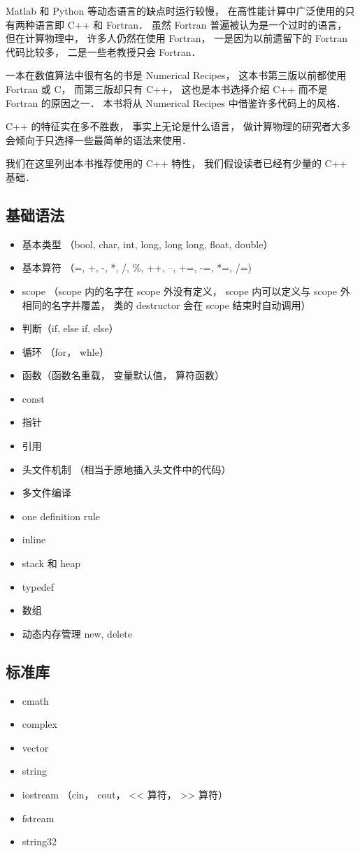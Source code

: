 
Matlab 和 Python 等动态语言的缺点时运行较慢， 在高性能计算中广泛使用的只有两种语言即 C++ 和 Fortran． 虽然 Fortran 普遍被认为是一个过时的语言， 但在计算物理中， 许多人仍然在使用 Fortran， 一是因为以前遗留下的 Fortran 代码比较多， 二是一些老教授只会 Fortran．

一本在数值算法中很有名的书是 Numerical Recipes， 这本书第三版以前都使用 Fortran 或 C， 而第三版却只有 C++， 这也是本书选择介绍 C++ 而不是 Fortran 的原因之一． 本书将从 Numerical Recipes 中借鉴许多代码上的风格．

C++ 的特征实在多不胜数， 事实上无论是什么语言， 做计算物理的研究者大多会倾向于只选择一些最简单的语法来使用．

我们在这里列出本书推荐使用的 C++ 特性， 我们假设读者已经有少量的 C++ 基础．

\subsection{基础语法}
\begin{itemize}
\item 基本类型 （bool, char, int, long, long long, float, double）
\item 基本算符 （=, +, -, *, /, \%, ++, --, +=, -=, *=, /=)
\item scope （scope 内的名字在 scope 外没有定义， scope 内可以定义与 scope 外相同的名字并覆盖， 类的 destructor 会在 scope 结束时自动调用）
\item 判断（if, else if, else）
\item 循环 （for， whle）
\item 函数（函数名重载， 变量默认值， 算符函数）
\item const
\item 指针
\item 引用
\item 头文件机制 （相当于原地插入头文件中的代码）
\item 多文件编译
\item one definition rule
\item inline
\item stack 和 heap
\item typedef
\item 数组
\item 动态内存管理 new, delete
\end{itemize}

\subsection{标准库}
\begin{itemize}
\item cmath
\item complex
\item vector
\item string
\item iostream （cin， cout， << 算符， >> 算符）
\item fstream
\item string32
\end{itemize}

